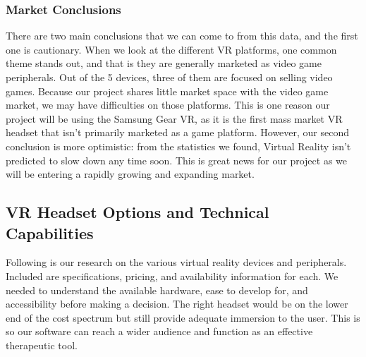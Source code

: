 \documentclass[a4paper,10pt]{article}
\begin{document}
\subsubsection{Market Conclusions}

There are two main conclusions that we can come to from this data, and the first one is cautionary.  When we look at the different VR platforms, one common theme stands out, and that is they are generally marketed as video game peripherals.  Out of the 5 devices, three of them are focused on selling video games.  Because our project shares little market space with the video game market, we may have difficulties on those platforms.  This is one reason our project will be using the Samsung Gear VR, as it is the first mass market VR headset that isn't primarily marketed as a game platform.  However, our second conclusion is more optimistic: from the statistics we found, Virtual Reality isn't predicted to slow down any time soon.  This is great news for our project as we will be entering a rapidly growing and expanding market.


\subsection{VR Headset Options and Technical Capabilities}
\label{section:headset}

Following is our research on the various virtual reality devices and peripherals. Included are specifications, pricing, and availability information for each. We needed to understand the available hardware, ease to develop for, and accessibility before making a decision. The right headset would be on the lower end of the cost spectrum but still provide adequate immersion to the user. This is so our software can reach a wider audience and function as an effective therapeutic tool.

\pagebreak   
\end{document}
